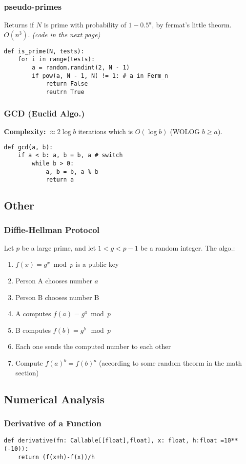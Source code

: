 \documentclass[]{article}
\begin{document}
\begin{multicols}{2}
		\subsubsection{pseudo-primes}
		Returns if $ N $ is prime with probability of $ 1 - 0.5^{a} $, by fermat's little theorm. $O(n^3)$. \textit{(code in the next page)}
		\pagebreak
		\begin{lstlisting}
def is_prime(N, tests): 
	for i in range(tests): 
		a = random.randint(2, N - 1)
		if pow(a, N - 1, N) != 1: # a in Ferm_n
			return False
			reutrn True\end{lstlisting}
		\subsubsection{GCD (Euclid Algo.)}
		\textbf{Complexity: }$ \approx 2 \log b $ iterations which is $ O(\log b) $ (WOLOG $ b \ge a $). 
		\begin{lstlisting}
def gcd(a, b): 
	if a < b: a, b = b, a # switch
		while b > 0: 
			a, b = b, a % b
			return a\end{lstlisting}
		
		\subsection{Other}
		\subsubsection{Diffie-Hellman Protocol}
		Let $ p $ be a large prime, and let $ 1 < g < p - 1 $ be a random integer. The algo.: 
		\begin{enumerate}
			\item $ f(x) = g^x \bmod p $ is a public key
			\item Person A chooses number $ a $
			\item Person B chooses number B
			\item A computes $ f(a) = g^a \bmod p $
			\item B computes $ f(b) = g^b \mod p $
			\item Each one sends the computed number to each other
			\item Compute $ f(a)^b = f(b)^a $ (according to some random theorm in the math section) 
		\end{enumerate}
		\subsection{Numerical Analysis}
		\subsubsection*{Derivative of a Function}
		\begin{lstlisting}
def derivative(fn: Callable[[float],float], x: float, h:float =10**(-10)):
	return (f(x+h)-f(x))/h
		\end{lstlisting}
	\end{multicols}
	
\end{document}
